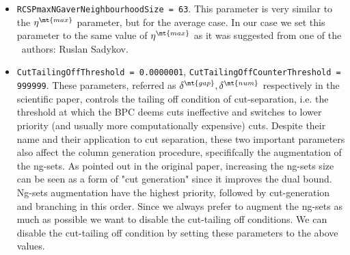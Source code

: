 \begin{itemize}
	\item \texttt{RCSPmaxNGaverNeighbourhoodSize = 63}.
	      This parameter is very similar to the $\eta^\mt{max}$ parameter, but for the average case.
	      In our case we set this parameter to the same value of $\eta^\mt{max}$ as it was suggested from one of the \bapcod\ authors: Ruslan Sadykov.
	\item \texttt{CutTailingOffThreshold = 0.0000001}, \texttt{CutTailingOffCounterThreshold = 999999}.
	      These parameters, referred as $\delta^\mt{gap}, \delta^\mt{num}$ respectively in the scientific paper,
	      controls the tailing off condition of cut-separation, i.e. the threshold
	      at which the BPC deems cuts ineffective and switches to lower priority
	      (and usually more computationally expensive) cuts.
	      Despite their name and their application to cut separation, these two important
	      parameters also affect the column generation procedure, specififcally the augmentation of the ng-sets.
	      As pointed out in the original paper,
	      increasing the ng-sets size can be seen as a form of "cut generation"
	      since it improves the dual bound.
	      Ng-sets augmentation have the highest priority, followed by cut-generation and branching in this order.
	      Since we always prefer to augment the ng-sets as much as possible we want
	      to disable the cut-tailing off conditions.
	      We can disable the cut-tailing off condition by setting these parameters to the above values.
\end{itemize}

\begin{comment}
[ About what is reduced cost fixing ]
[ Bucket arc elimination procedure = Reduced cost fixing procedure]
\textcite{sadykov2021}
VRPSolver extension includes an implementation of the pricing functor which
allows the user to define the subproblems as resource constrained shortest path
problems in graphs. The functor implements the bucket-graph based labeling
algorithm from paper [16] for solving the pricing problem, as well as the corre-
sponding bucket arc elimination procedure (i.e. reduced cost fixing procedure),
and the elementary route enumeration procedure [1]. VRPSolver extension also
implements cut separation functors for rounded cap
\end{comment}

